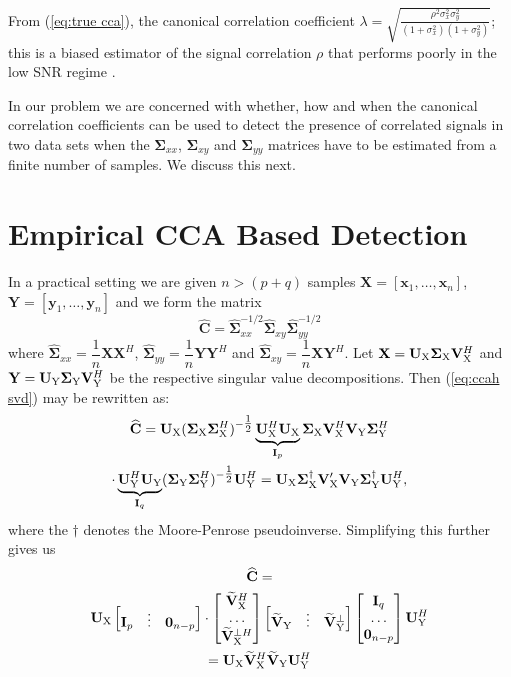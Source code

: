 \documentclass[conference]{IEEEtran}
\newcommand{\X}{\mathbf{X}}
\newcommand{\Y}{\mathbf{Y}}
\newcommand{\Ux}{{\mathbf{U}}_{{\rm X}}}
\newcommand{\Uy}{{\mathbf{U}}_{{\rm Y}}}
\newcommand{\Vx}{{\mathbf{V}}_{{\rm X}}}
\newcommand{\Vy}{{\mathbf{V}}_{{\rm Y}}}
\newcommand{\Vxt}{\widetilde{{\mathbf{V}}}_{{\rm X}}}
\newcommand{\Vyt}{\widetilde{{\mathbf{V}}}_{{\rm Y}}}
\newcommand{\Sigxh}{{\mathbf{\Sigma}}_{{\rm X}}}
\newcommand{\Sigyh}{{\mathbf{\Sigma}}_{{\rm Y}}}
\newcommand{\svdX}{\Ux\Sigxh\Vx^{H}}
\newcommand{\svdY}{\Uy\Sigyh\Vy^{H}}
\newcommand{\x}{\mathbf{x}}
\newcommand{\y}{\mathbf{y}}
\newcommand{\Sx}{\mathbf{\Sigma}_{xx}}
\newcommand{\Sxh}{\widehat{\mathbf{\Sigma}}_{xx}}
\newcommand{\Sy}{\mathbf{\Sigma}_{yy}}
\newcommand{\Syh}{\widehat{\mathbf{\Sigma}}_{yy}}
\newcommand{\Sxy}{\mathbf{\Sigma}_{xy}}
\newcommand{\Sxyh}{\widehat{\mathbf{\Sigma}}_{xy}}
\newcommand{\CCh}{\widehat{\mathbf{C}}}
\begin{document}
From (\ref{eq:true cca}), the canonical correlation coefficient $\lambda = \sqrt{\tfrac{\rho^2 \sigma_{x}^2\sigma^2_{y}}{(1+\sigma_x^{2})(1+\sigma_y^{2})}}$; this is a biased estimator of the signal correlation $\rho$ that performs poorly in the low SNR regime \cite{ge2009does}.

In our problem we are concerned with whether, how and when the canonical correlation coefficients can be used to detect the presence of correlated signals in two data sets when the $\Sx$, $\Sxy$ and $\Sy$ matrices have to be estimated from a finite number of samples. We discuss this next.

\section{Empirical CCA Based Detection}\label{sec:emp cca detection}
In a practical setting we are given $n>(p+q)$ samples $\X = [\x_{1}, \ldots, \x_{n}]$, $\Y = [\y_{1}, \ldots, \y_{n}]$ and we form the matrix
\begin{equation}\label{eq:ccah svd}
\CCh = \Sxh^{-1/2} \Sxyh \Syh^{-1/2}
\end{equation}
where $\Sxh = \dfrac{1}{n} \X\X^{H}$, $\Syh = \dfrac{1}{n} \Y\Y^{H}$ and $\Sxyh = \dfrac{1}{n} \X\Y^{H}$. Let $\X = \svdX$ and $\Y = \svdY$ be the respective singular value decompositions. Then (\ref{eq:ccah svd}) may be rewritten as:
\begin{multline*}
\CCh = \Ux (\Sigxh \Sigxh^{H})^{-\tfrac{1}{2}} \underbrace{\Ux^{H} \Ux}_{{\bf I}_{p}} \Sigxh \Vx^{H} \Vy \Sigyh^{H} \\
\cdot \underbrace{\Uy^{H} \Uy}_{{\bf I}_{q}} (\Sigyh \Sigyh^{H})^{-\tfrac{1}{2}} \Uy^{H} = \Ux \Sigxh^{\dagger} \Vx' \Vy \Sigyh^{\dagger} \Uy^{H},
\end{multline*}
where the $\dagger$ denotes the Moore-Penrose pseudoinverse. Simplifying this further gives us
\begin{multline}
 \CCh   = \\\Ux \begin{bmatrix}{\bf I}_{p} &\vdots  & {\bf 0}_{n-p} \end{bmatrix} \cdot \begin{bmatrix} \Vxt^{H} \\ \ldots \\ \Vxt^{\bot H}\end{bmatrix}
      \begin{bmatrix} \Vyt & \vdots &\Vyt^{\bot}\end{bmatrix} \begin{bmatrix}{\bf I}_{q} \\ \ldots \\{\bf 0}_{n-p} \end{bmatrix} \Uy^{H}\\
 = \Ux \Vxt^{H} \Vyt \Uy^{H} \label{eq:ccah master}
\end{multline}
\end{document}
